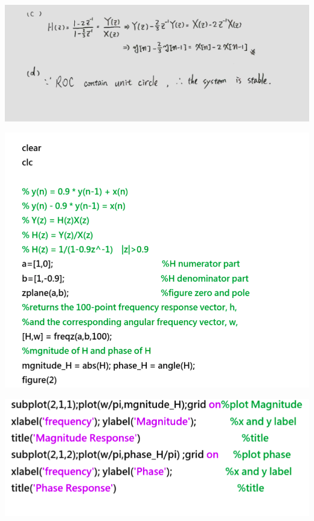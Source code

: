 \documentclass[a4paper]{article}
\begin{document}
	\begin{center}
		\includegraphics[width=1\linewidth]{screenshot057}
	\end{center}
	
	\begin{center}
		\includegraphics[width=1\linewidth]{screenshot058}
	\end{center}
	
	\begin{center}
		\includegraphics[width=1\linewidth]{screenshot060}
	\end{center}
	
\end{document}
